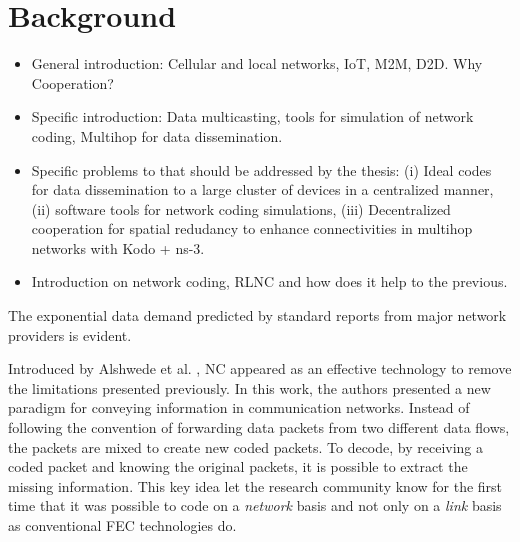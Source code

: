 \section{Background}\label{sec:background}

\begin{itemize}
\item General introduction: Cellular and local networks, \ac{IoT}, \ac{M2M}, \ac{D2D}. Why Cooperation?
\item Specific introduction: Data multicasting, tools for simulation of network coding, Multihop for data dissemination.
\item Specific problems to that should be addressed by the thesis: (i) Ideal codes for data dissemination to a large cluster of devices in a centralized manner, (ii) software tools for network coding simulations, (iii) Decentralized cooperation for spatial redudancy to enhance connectivities in multihop networks with Kodo + ns-3.
\item Introduction on network coding, RLNC and how does it help to the previous.
\end{itemize}

The exponential data demand predicted by standard reports from major network providers is evident.

Introduced by Alshwede et al. \cite{ahlswede2000network}, \ac{NC} appeared as an effective technology to remove the limitations presented previously. In this work, the authors presented a new paradigm for conveying information in communication networks. Instead of following the convention of forwarding data packets from two different data flows, the packets are mixed to create new coded packets. To decode, by receiving a coded packet and knowing the original packets, it is possible to extract the missing information. This key idea let the research community know for the first time that it was possible to code on a \textit{network} basis and not only on a \textit{link} basis as conventional \ac{FEC} technologies do.  